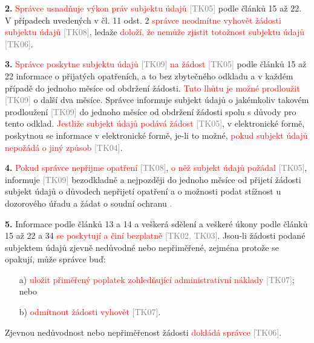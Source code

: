\begin{itemize}
  \vspace{0.5em}
  \textbf{2.} \textcolor{red}{Správce usnadňuje výkon práv subjektu údajů} \textcolor{gray}{[TK05]} podle článků 15 až 22. V případech uvedených v čl. 11 odst. 2 \textcolor{red}{správce neodmítne vyhovět žádosti subjektu údajů} \textcolor{gray}{[TK08]}, ledaže \textcolor{red}{doloží, že nemůže zjistit totožnost subjektu údajů} \textcolor{gray}{[TK06]}.

  \vspace{0.5em}
  \textbf{3.} \textcolor{red}{Správce poskytne subjektu údajů} \textcolor{gray}{[TK09]} \textcolor{red}{na žádost} \textcolor{gray}{[TK05]} podle článků 15 až 22 informace o přijatých opatřeních, a to \textcolor{OliveGreen}{bez zbytečného odkladu a v každém případě do jednoho měsíce od obdržení žádosti}.  
  \textcolor{red}{Tuto lhůtu je možné prodloužit} \textcolor{gray}{[TK09]} \textcolor{OliveGreen}{o další dva měsíce.}  
  \textcolor{NavyBlue}{Správce informuje subjekt údajů o jakémkoliv takovém prodloužení} \textcolor{gray}{[TK09]} \textcolor{OliveGreen}{do jednoho měsíce od obdržení žádosti spolu s důvody pro tento odklad}.  
  \textcolor{red}{Jestliže subjekt údajů podává žádost} \textcolor{gray}{[TK05]}, \textcolor{OliveGreen}{v elektronické formě}, \textcolor{NavyBlue}{poskytnou se informace} \textcolor{OliveGreen}{v elektronické formě}, je-li to možné, \textcolor{red}{pokud subjekt údajů nepožádá o jiný způsob} \textcolor{gray}{[TK04]}.

  \vspace{0.5em}
  \textbf{4.} \textcolor{red}{Pokud správce nepřijme opatření} \textcolor{gray}{[TK08]}, \textcolor{red}{o něž subjekt údajů požádal} \textcolor{gray}{[TK05]}, \textcolor{NavyBlue}{informuje} \textcolor{gray}{[TK09]} \textcolor{OliveGreen}{bezodkladně a nejpozději do jednoho měsíce od přijetí žádosti} subjekt údajů \textcolor{OliveGreen}{o důvodech nepřijetí opatření a o možnosti podat stížnost u dozorového úřadu a žádat o soudní ochranu} \textcolor{gray}.

  \vspace{0.5em}
  \textbf{5.} Informace podle článků 13 a 14 a veškerá sdělení a veškeré úkony podle článků 15 až 22 a 34 \textcolor{red}{se poskytují a činí bezplatně} \textcolor{gray}{[TK02, TK03]}.  
  Jsou-li žádosti podané subjektem údajů \textcolor{OliveGreen}{zjevně nedůvodné nebo nepřiměřené, zejména protože se opakují}, může správce buď:  
  \begin{itemize}
    \item[a)] \textcolor{red}{uložit přiměřený poplatek zohledňující administrativní náklady} \textcolor{gray}{[TK07]}; nebo
    \item[b)] \textcolor{red}{odmítnout žádosti vyhovět} \textcolor{gray}{[TK07]}.
  \end{itemize}
  \textcolor{OliveGreen}{Zjevnou nedůvodnost nebo nepřiměřenost žádosti} \textcolor{red}{dokládá správce} \textcolor{gray}{[TK06]}.


\end{itemize}
